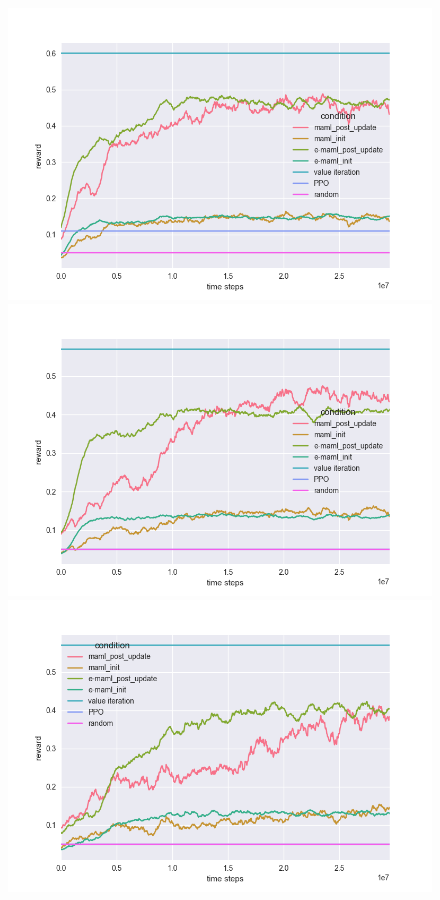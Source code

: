 \documentclass{article} %
\begin{document}
\begin{figure}[H]
\begin{center}
\includegraphics[scale=0.16]{bradly_curves/gap_grids_maml_0.png}%
\includegraphics[scale=0.16]{bradly_curves/gap_grids_maml_1.png}
\includegraphics[scale=0.16]{bradly_curves/gap_grids_maml_3.png}%

\end{center}
\end{figure}
\end{document}
